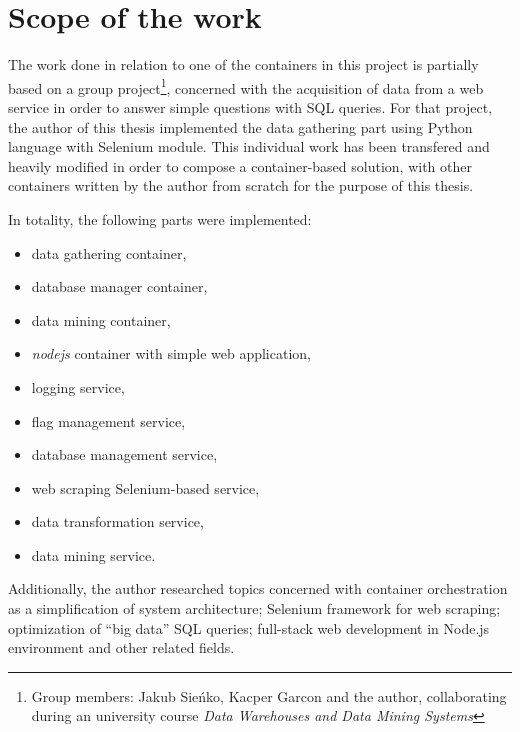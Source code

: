 \section{Scope of the work}
The work done in relation to one of the containers in this project is partially based on a group project\footnote{Group members: Jakub Sieńko, Kacper Garcon and the author, collaborating during an university course \textit{Data Warehouses and Data Mining Systems}}, concerned with the acquisition of data from a web service in order to answer simple questions with SQL queries. For that project, the author of this thesis implemented the data gathering part using Python language with Selenium module. This individual work has been transfered and heavily modified in order to compose a container-based solution, with other containers written by the author from scratch for the purpose of this thesis. \par
In totality, the following parts were implemented:
\begin{itemize}
    \item data gathering container,
    \item database manager container,
    \item data mining container,
    \item \textit{nodejs} container with simple web application,
    \item logging service,
    \item flag management service,
    \item database management service,
    \item web scraping Selenium-based service,
    \item data transformation service,
    \item data mining service.
\end{itemize}
Additionally, the author researched topics concerned with container orchestration as a simplification of system architecture; Selenium framework for web scraping; optimization of ``big data'' SQL queries; full-stack web development in Node.js environment and other related fields.


